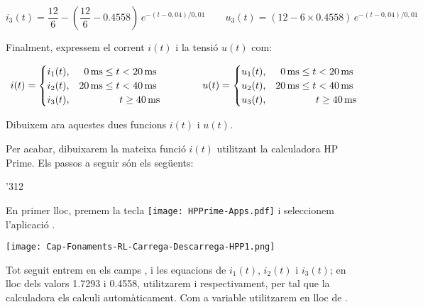 \begin{exemple}
    \[
        i_3(t) = \frac{12}{6} - \left(\frac{12}{6}-\num{0,4558}\right) \,e^{-(t-0,04)/0,01} \qquad
        u_3(t) = (12-6\times\num{0,4558}) \,e^{-(t-0,04)/0,01}
    \]

    Finalment,  expressem el corrent $i(t)$  i la tensió $u(t)$ com:

    \[
        i(t) =
        \begin{cases}
            i_1(t), &  \phantom{0}\qty{0}{ms} \leq t < \qty{20}{ms} \\
            i_2(t), &  \qty{20}{ms} \leq t < \qty{40}{ms} \\
            i_3(t), &  \hspace{1.43cm}t \geq \qty{40}{ms}
        \end{cases}
        \qquad\qquad
        u(t) =
        \begin{cases}
            u_1(t), &  \phantom{0}\qty{0}{ms} \leq t < \qty{20}{ms} \\
            u_2(t), &  \qty{20}{ms} \leq t < \qty{40}{ms} \\
            u_3(t), &  \hspace{1.43cm}t \geq \qty{40}{ms}
        \end{cases}
    \]

    Dibuixem ara aquestes dues funcions  $i(t)$ i $u(t)$.

    \begin{center}
      
    \end{center}

    Per acabar, dibuixarem la mateixa funció $i(t)$ utilitzant la calculadora \textsf{HP Prime}.
     Els passos a seguir són els següents:
    \begin{dingautolist}{'312}
        \item En primer lloc, premem la tecla \texttt{[image: HPPrime-Apps.pdf]} i seleccionem l'aplicació .

             \texttt{[image: Cap-Fonaments-RL-Carrega-Descarrega-HPP1.png]}

        \item Tot seguit entrem en els camps ,  i  les equacions de $i_1(t)$, $i_2(t)$ i $i_3(t)$; en lloc dels valors \num{1,7293} i  \num{0,4558}, utilitzarem  i  respectivament, per tal que la calculadora els calculi automàticament. Com a variable utilitzarem  en lloc de .


\end{dingautolist}
\end{exemple}
